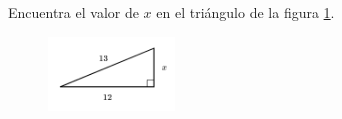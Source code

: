 \question[15]  Encuentra el valor de $x$ en el triángulo de la figura \ref{fig:lados_pitagoras_26}.
\begin{figure}[H]
    \begin{center}
        \includegraphics[width=0.3\textwidth]{../images/lados_pitagoras_26.png}
    \end{center}
    \caption{}
    \label{fig:lados_pitagoras_26}
\end{figure}
